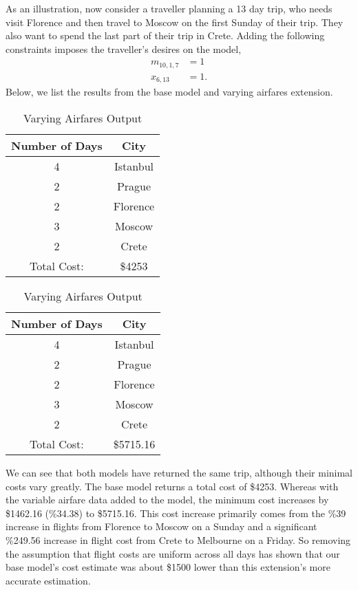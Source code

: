 \documentclass[12pt]{article}
\begin{document}
As an illustration, now consider a traveller planning a 13 day trip, who needs visit Florence and then travel to Moscow on the first Sunday of their trip. They also want to spend the last part of their trip in Crete. Adding the following constraints imposes the traveller's desires on the model,
\begin{align}
m_{10,1,7} &= 1 \nonumber\\
x_{6,13} &= 1. \nonumber
\end{align}
Below, we list the results from the base model and varying airfares extension.

\begin{table}[ht]
	\begin{minipage}[b]{0.45\linewidth}
		\caption{Base Model Output}
		\centering
		\vspace{1mm}
		\begin{tabular}{| c || c |}
			\hline
			Number of Days & City \\ \hline \hline
			4 & Istanbul \\ \hline
			2 & Prague \\ \hline
			2 & Florence \\ \hline
			3 & Moscow \\ \hline
			2 & Crete \\ \hline
			Total Cost: & \$4253 \\ \hline
		\end{tabular}
		\label{varying_airfares_example_1}
	\end{minipage}
	\hspace{0.5cm}
	\begin{minipage}[b]{0.45\linewidth}
		\caption{Varying Airfares Output}
		\centering
		\vspace{1mm}
		\begin{tabular}{| c || c |}
			\hline
			Number of Days & City \\ \hline \hline
			4 & Istanbul \\ \hline
			2 & Prague \\ \hline
			2 & Florence \\ \hline
			3 & Moscow \\ \hline
			2 & Crete \\ \hline
			Total Cost: & \$5715.16 \\ \hline
		\end{tabular}
		\label{varying_airfares_example_2}
	\end{minipage}
\end{table}

We can see that both models have returned the same trip, although their minimal costs vary greatly. The base model returns a total cost of \$4253. Whereas with the variable airfare data added to the model, the minimum cost increases by \$1462.16 (\%34.38) to \$5715.16. This cost increase primarily comes from the \%39 increase in flights from Florence to Moscow on a Sunday and a significant \%249.56 increase in flight cost from Crete to Melbourne on a Friday.  So removing the assumption that flight costs are uniform across all days has shown that our base model's cost estimate was about \$1500 lower than this extension's more accurate estimation.
\end{document}
